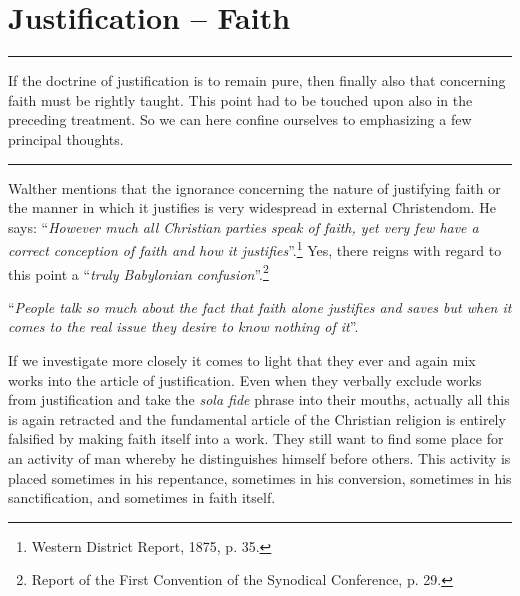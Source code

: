 \chapter{Justification -- Faith}
\hrule
\vspace{.30cm}
If the doctrine of justification is to remain pure, then finally also that concerning faith must be rightly taught.  This point had to be touched upon also in the preceding treatment.  So we can here confine ourselves to emphasizing a few principal thoughts.
\vspace{.30cm}
\hrule
\vspace{1.25cm}
                Walther mentions that the ignorance concerning the nature of justifying faith or the manner in which it justifies is very widespread in external Christendom.  He says: “\textit{However much all Christian parties speak of faith, yet very few have a correct conception of faith and how it justifies}”.\footnote{Western District Report, 1875, p. 35.}  Yes, there reigns with regard to this point a “\textit{truly Babylonian confusion}”.\footnote{Report of the First Convention of the Synodical Conference, p. 29.} \begin{displayquote} “\textit{People talk so much about the fact that faith alone justifies and saves but when it comes to the real issue they desire to know nothing of it}”.\end{displayquote}  If we investigate more closely it comes to light that they ever and again mix works into the article of justification.  Even when they verbally exclude works from justification and take the \textit{sola fide} phrase into their mouths, actually all this is again retracted and the fundamental article of the Christian religion is entirely falsified by making faith itself into a work.  They still want to find some place for an activity of man whereby he distinguishes himself before others.  This activity is placed sometimes in his repentance, sometimes in his conversion, sometimes in his sanctification, and sometimes in faith itself.

